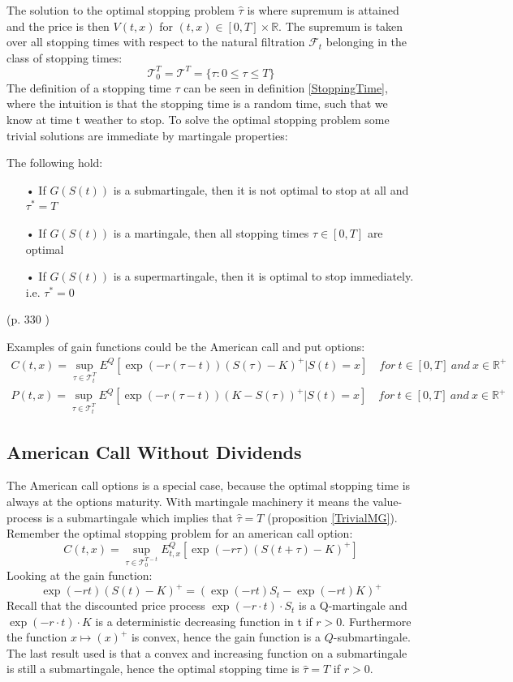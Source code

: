 The solution to the optimal stopping problem $\hat{\tau}$ is where supremum is attained and the price is then $V(t,x)$ for $(t,x)\in [0,T] \times \mathbb{R}$. The supremum is taken over all stopping times with respect to the natural filtration $\mathcal{F}_{t}$ belonging in the class of stopping times:
$$\mathcal{T}_0^T=\mathcal{T}^T=\{\tau : 0 \leq \tau \leq T \}$$
The definition of a stopping time $\tau$ can be seen in definition \ref{StoppingTime}, where the intuition is that the stopping time is a random time, such that we know at time t weather to stop. To solve the optimal stopping problem some trivial solutions are immediate by martingale properties:
\begin{proposition}\label{TrivialMG}
The following hold:
\begin{enumerate}
\item[•] If $G(S(t))$ is a submartingale, then it is not optimal to stop at all and $\tau^*=T$
\item[•] If $G(S(t))$ is a martingale, then all stopping times $\tau\in [0,T]$ are optimal
\item[•] If $G(S(t))$ is a supermartingale, then it is optimal to stop immediately. i.e. $\tau^*=0$
\end{enumerate}
(p. 330 \parencite{finKont})
\end{proposition}

Examples of gain functions could be the American call and put options:
\begin{align}
C(t,x)=\sup_{\tau \in \mathcal{T}_t^T} E^Q[\exp(-r(\tau-t)) (S(\tau)-K)^+|S(t)=x] \quad for \ t\in [0,T] \ and \ x\in\mathbb{R}^+\\
P(t,x)=\sup_{\tau \in \mathcal{T}_t^T} E^Q[\exp(-r(\tau-t)) (K-S(\tau))^+|S(t)=x] \quad for \ t\in [0,T] \ and \ x\in\mathbb{R}^+
\end{align}


\subsection{American Call Without Dividends}\label{AmericanCall}
The American call options is a special case, because the optimal stopping time is always at the options maturity. With martingale machinery it means the value-process is a submartingale which implies that $\hat{\tau}=T$ (proposition \ref{TrivialMG}). Remember the optimal stopping problem for an american call option:
$$C(t,x)=\sup_{\tau \in \mathcal{T}_0^{T-t}} E_{t,x}^Q[\exp(-r\tau) (S(t+\tau)-K)^+]$$
Looking at the gain function:
\begin{equation*}
\exp(-r t) (S(t)-K)^+ = (\exp(-r t) S_{t} - \exp(-r t) K)^+
\end{equation*}
Recall that the discounted price process $\exp(-r\cdot t) \cdot S_t$ is a Q-martingale and $\exp(-r\cdot t) \cdot K$ is a deterministic decreasing function in t if $r>0$. Furthermore the function $x \mapsto (x)^+$ is convex, hence the gain function is a $Q$-submartingale. The last result used is that a convex and increasing function on a submartingale is still a submartingale, hence the optimal stopping time is $\hat{\tau}=T$ if $r>0$.

